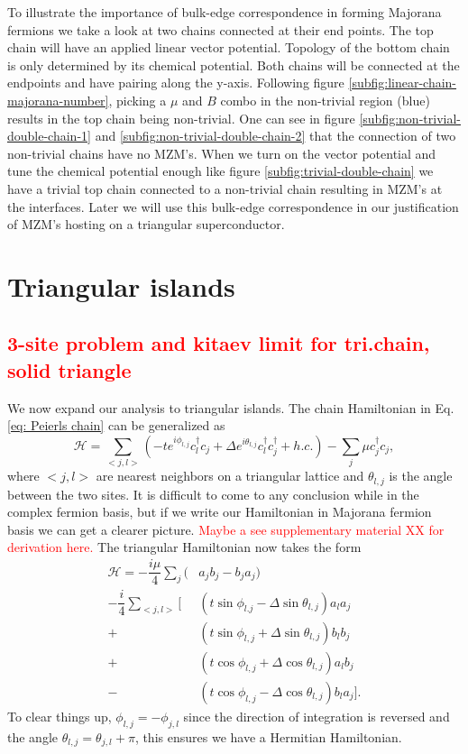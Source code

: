 \documentclass[aps,prb,showpacs,twocolumn,amsmath,amssymb,superscriptaddress]{revtex4-2}
\newcommand{\Red}[1]{\textcolor{red}{#1}}
\newcommand{\Ham}{\mathcal{H}}
\newcommand{\cc}{c^{\dagger}}
\newcommand{\de}{\Delta}
\begin{document}
To illustrate the importance of bulk-edge correspondence in forming Majorana fermions we take a look at two chains connected at their end points.
The top chain will have an applied linear vector potential.
Topology of the bottom chain is only determined by its chemical potential.
Both chains will be connected at the endpoints and have pairing along the y-axis.
Following figure \ref{subfig:linear-chain-majorana-number}, picking a $\mu$ and $B$ combo in the non-trivial region (blue) results in the top chain being non-trivial.
One can see in figure \ref{subfig:non-trivial-double-chain-1} and \ref{subfig:non-trivial-double-chain-2} that the connection of two non-trivial chains have no MZM's.
When we turn on the vector potential and tune the chemical potential enough like figure \ref{subfig:trivial-double-chain} we have a trivial top chain connected to a non-trivial chain resulting in MZM's at the interfaces.
Later we will use this bulk-edge correspondence in our justification of MZM's hosting on a triangular superconductor.

\section{Triangular islands}

\subsection{\Red{3-site problem and kitaev limit for tri.chain, solid triangle}}
We now expand our analysis to triangular islands.
The chain Hamiltonian in Eq. \ref{eq: Peierls chain} can be generalized as
\begin{equation} \label{eq: Peierls triangle}
  \Ham = \sum_{<j,l>} (-t e^{i\phi_{l,j}} \cc_{l} c_j + \de e^{i\theta_{l,j}} \cc_{l}\cc_j + h.c.) - \sum_j \mu \cc_j c_j,
\end{equation}
where $<j,l>$ are nearest neighbors on a triangular lattice and $\theta_{l,j}$ is the angle between the two sites.
It is difficult to come to any conclusion while in the complex fermion basis, but if we write our Hamiltonian in Majorana fermion basis we can get a clearer picture.
\Red{Maybe a see supplementary material XX for derivation here.}
The triangular Hamiltonian now takes the form
\begin{align}
  \Ham = -\dfrac{i\mu}{4} \sum_j (& a_j b_j - b_j a_j) \nonumber \\
  -\dfrac{i}{4} \sum_{<j,l>} [&(t\sin\phi_{l.j}-\de\sin\theta_{l,j}) a_l a_j \nonumber \\
  +&(t\sin\phi_{l,j}+\de\sin\theta_{l,j}) b_l b_j \nonumber \\
  +&(t\cos\phi_{l,j}+\de\cos\theta_{l,j}) a_l b_j \nonumber \\
  -&(t\cos\phi_{l,j}-\de\cos\theta_{l,j}) b_l a_j].
\end{align}
To clear things up, $\phi_{l,j} = -\phi_{j,l}$ since the direction of integration is reversed and the angle $\theta_{l,j} = \theta_{j,l} + \pi$, this ensures we have a Hermitian Hamiltonian.
\end{document}

